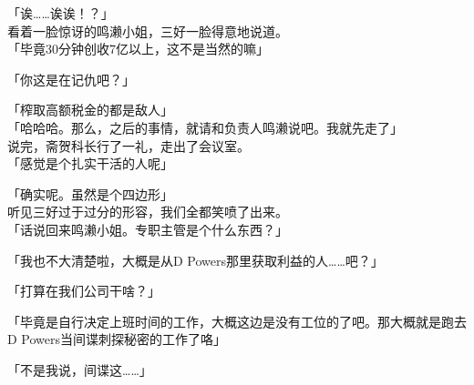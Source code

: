 「诶……诶诶！？」\\

看着一脸惊讶的鸣濑小姐，三好一脸得意地说道。\\

「毕竟30分钟创收7亿以上，这不是当然的嘛」

「你这是在记仇吧？」

「榨取高额税金的都是敌人」\\

「哈哈哈。那么，之后的事情，就请和负责人鸣濑说吧。我就先走了」\\

说完，斋贺科长行了一礼，走出了会议室。\\

「感觉是个扎实干活的人呢」

「确实呢。虽然是个四边形」\\

听见三好过于过分的形容，我们全都笑喷了出来。\\

「话说回来鸣濑小姐。专职主管是个什么东西？」

「我也不大清楚啦，大概是从D Powers那里获取利益的人……吧？」

「打算在我们公司干啥？」

「毕竟是自行决定上班时间的工作，大概这边是没有工位的了吧。那大概就是跑去D Powers当间谍刺探秘密的工作了咯」

「不是我说，间谍这……」\\

